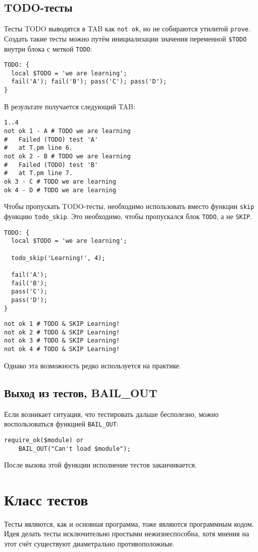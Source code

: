 \subsection{TODO-тесты}
Тесты TODO выводятся в TAB как \verb|not ok|, но не собираются утилитой \verb|prove|. Создать такие тесты можно путём инициализации значения переменной \verb|$TODO| внутри блока с меткой \verb|TODO|:
\begin{verbatim}
TODO: {
  local $TODO = 'we are learning';
  fail('A'); fail('B'); pass('C'); pass('D');
}
\end{verbatim}
В результате получается следующий TAB:
\begin{verbatim}
1..4
not ok 1 - A # TODO we are learning
#   Failed (TODO) test 'A'
#   at T.pm line 6.
not ok 2 - B # TODO we are learning
#   Failed (TODO) test 'B'
#   at T.pm line 7.
ok 3 - C # TODO we are learning
ok 4 - D # TODO we are learning
\end{verbatim}
Чтобы пропускать TODO-тесты, необходимо использовать вместо функции \verb|skip| функцию \verb|todo_skip|. Это необходимо, чтобы пропускался блок \verb|TODO|, а не \verb|SKIP|.
\begin{verbatim}
TODO: {
  local $TODO = 'we are learning';

  todo_skip('Learning!', 4);

  fail('A');
  fail('B');
  pass('C');
  pass('D');
}
\end{verbatim}
\begin{verbatim}
not ok 1 # TODO & SKIP Learning!
not ok 2 # TODO & SKIP Learning!
not ok 3 # TODO & SKIP Learning!
not ok 4 # TODO & SKIP Learning!
\end{verbatim}
Однако эта возможность редко используется на практике.

\subsection{Выход из тестов, BAIL\_OUT}
Если возникает ситуация, что тестировать дальше бесполезно, можно воспользоваться функцией \verb|BAIL_OUT|:
\begin{verbatim}
require_ok($module) or
    BAIL_OUT("Can't load $module");
\end{verbatim}
После вызова этой функции исполнение тестов заканчивается.

\section{Класс тестов}
Тесты являются, как и основная программа, тоже являются программным кодом. Идея делать тесты исключительно простыми нежизнеспособна, хотя мнения на этот счёт существуют диаметрально противоположные.

